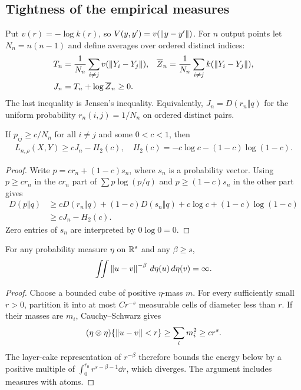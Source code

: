 \subsection{Tightness of the empirical measures}\label{sec:output-compactness}
Put $v(r)=-\log k(r)$, so $V(y,y')=v(\left\lVert y-y'\right\rVert)$. For $n$ output points let $N_n=n(n-1)$ and define averages over ordered distinct indices:
\begin{align}\label{eq:pair-gap}
T_n&=\frac1{N_n}\sum_{i\ne j}v(\left\lVert Y_i-Y_j\right\rVert),
&\overline Z_n&=\frac1{N_n}\sum_{i\ne j}k(\left\lVert Y_i-Y_j\right\rVert),\\
J_n&=T_n+\log\overline Z_n\geq0.\nonumber
\end{align}
The last inequality is Jensen's inequality. Equivalently, $J_n=D(r_n\Vert q)$ for the uniform probability $r_n(i,j)=1/N_n$ on ordered distinct pairs.

\begin{lemma}\label{lem:entropy-mixture}
If $p_{ij}\geq c/N_n$ for all $i\ne j$ and some $0<c<1$, then
\begin{align}\label{eq:mixture-bound}
L_{n,\rho}(X,Y)\geq cJ_n-H_2(c),
\quad H_2(c)=-c\log c-(1-c)\log(1-c).
\end{align}
\end{lemma}
\begin{proof}
Write $p=cr_n+(1-c)s_n$, where $s_n$ is a probability vector. Using $p\geq cr_n$ in the $cr_n$ part of $\sum p\log(p/q)$ and $p\geq(1-c)s_n$ in the other part gives
\begin{align}
D(p\Vert q)&\geq cD(r_n\Vert q)+(1-c)D(s_n\Vert q)
+c\log c+(1-c)\log(1-c)\\
&\geq cJ_n-H_2(c).
\end{align}
Zero entries of $s_n$ are interpreted by $0\log0=0$.
\end{proof}

\begin{lemma}\label{lem:riesz}
For any probability measure $\eta$ on $\mathbb{R}^s$ and any $\beta\geq s$,
\begin{align}\label{eq:riesz-infinite}
\iint\left\lVert u-v\right\rVert^{-\beta}\,d\eta(u)\,d\eta(v)=\infty.
\end{align}
\end{lemma}
\begin{proof}
Choose a bounded cube of positive $\eta$-mass $m$. For every sufficiently small $r>0$, partition it into at most $C r^{-s}$ measurable cells of diameter less than $r$. If their masses are $m_i$, Cauchy--Schwarz gives
\begin{align}
(\eta\otimes\eta)\{\left\lVert u-v\right\rVert<r\}\geq\sum_i m_i^2\geq c r^s.
\end{align}
The layer-cake representation of $r^{-\beta}$ therefore bounds the energy below by a positive multiple of $\int_0^{r_0}r^{s-\beta-1}\dd r$, which diverges. The argument includes measures with atoms.
\end{proof}

